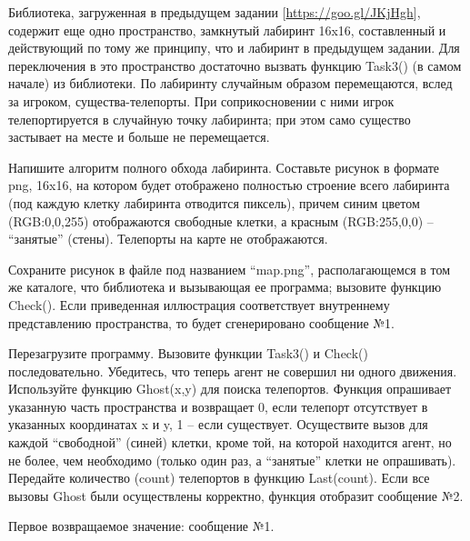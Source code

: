 
Библиотека, загруженная в предыдущем задании [\url{https://goo.gl/JKjHgh}], содержит еще одно пространство, замкнутый лабиринт 16x16, составленный и действующий по тому же принципу, что и лабиринт в предыдущем задании. Для переключения в это пространство достаточно вызвать функцию Task3() (в самом начале) из библиотеки. По лабиринту случайным образом перемещаются, вслед за игроком, существа-телепорты. При соприкосновении с ними игрок телепортируется в случайную точку лабиринта; при этом само существо застывает на месте и больше не перемещается.

Напишите алгоритм полного обхода лабиринта. Составьте рисунок в формате png, 16x16, на котором будет отображено полностью строение всего лабиринта (под каждую клетку лабиринта отводится пиксель), причем синим цветом (RGB:0,0,255) отображаются свободные клетки, а красным (RGB:255,0,0) – “занятые” (стены). Телепорты на карте не отображаются.

Сохраните рисунок в файле под названием “map.png”, располагающемся в том же каталоге, что библиотека и вызывающая ее программа; вызовите функцию Check(). Если приведенная иллюстрация соответствует внутреннему представлению пространства, то будет сгенерировано сообщение №1.

Перезагрузите программу. Вызовите функции Task3() и Check() последовательно. Убедитесь, что теперь агент не совершил ни одного движения. Используйте функцию Ghost(x,y) для поиска телепортов. Функция опрашивает указанную часть пространства и возвращает 0, если телепорт отсутствует в указанных координатах x и y, 1 – если существует. Осуществите вызов для каждой “свободной” (синей) клетки, кроме той, на которой находится агент, но не более, чем необходимо (только один раз, а “занятые” клетки не опрашивать). Передайте количество (count) телепортов в функцию Last(count). Если все вызовы Ghost были осуществлены корректно, функция отобразит сообщение №2.

Первое возвращаемое значение: сообщение №1.



